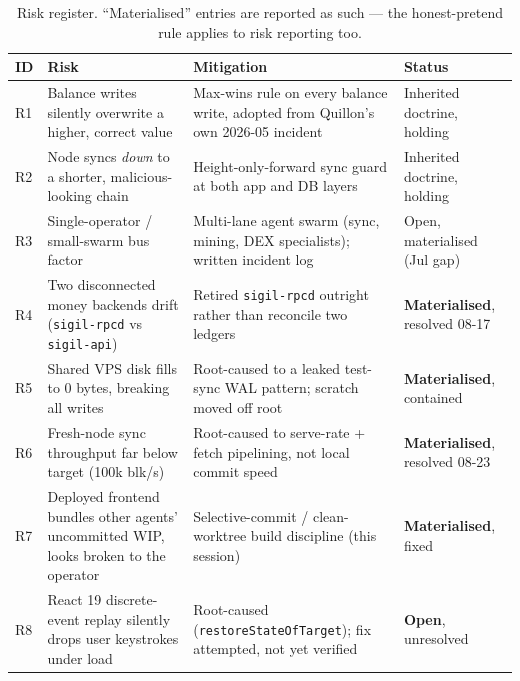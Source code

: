 \begin{table}[h]
\centering
\small
\begin{tabular}{@{}p{0.4cm}p{4.6cm}p{5.6cm}p{3.6cm}@{}}
\toprule
\textbf{ID} & \textbf{Risk} & \textbf{Mitigation} & \textbf{Status} \\
\midrule
R1 & Balance writes silently overwrite a higher, correct value & Max-wins rule on every balance write, adopted from Quillon's own 2026-05 incident & Inherited doctrine, holding \\
R2 & Node syncs \emph{down} to a shorter, malicious-looking chain & Height-only-forward sync guard at both app and DB layers & Inherited doctrine, holding \\
R3 & Single-operator / small-swarm bus factor & Multi-lane agent swarm (sync, mining, DEX specialists); written incident log & Open, materialised (Jul gap) \\
R4 & Two disconnected money backends drift (\texttt{sigil-rpcd} vs \texttt{sigil-api}) & Retired \texttt{sigil-rpcd} outright rather than reconcile two ledgers & \textbf{Materialised}, resolved 08-17 \\
R5 & Shared VPS disk fills to 0 bytes, breaking all writes & Root-caused to a leaked test-sync WAL pattern; scratch moved off root & \textbf{Materialised}, contained \\
R6 & Fresh-node sync throughput far below target (100k blk/s) & Root-caused to serve-rate + fetch pipelining, not local commit speed & \textbf{Materialised}, resolved 08-23 \\
R7 & Deployed frontend bundles other agents' uncommitted WIP, looks broken to the operator & Selective-commit / clean-worktree build discipline (this session) & \textbf{Materialised}, fixed \\
R8 & React 19 discrete-event replay silently drops user keystrokes under load & Root-caused (\texttt{restoreStateOfTarget}); fix attempted, not yet verified & \textbf{Open}, unresolved \\
\bottomrule
\end{tabular}
\caption{Risk register. ``Materialised'' entries are reported as such --- the honest-pretend rule applies to risk reporting too.}
\label{tab:risks}
\end{table}

